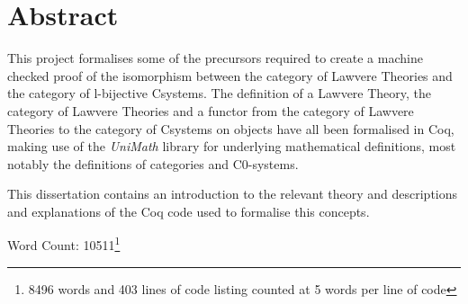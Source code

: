 \chapter*{\centering Abstract}
This project formalises some of the precursors required to create a machine
checked proof of the isomorphism between the category of Lawvere Theories and
the category of l-bijective Csystems. The definition of a Lawvere Theory, the
category of Lawvere Theories and a functor from the category of Lawvere Theories
to the category of Csystems on objects have all been formalised in Coq, making
use of the \textit{UniMath} library for underlying mathematical definitions,
most notably the definitions of categories and C0-systems.

This dissertation contains an introduction to the relevant theory and
descriptions and explanations of the Coq code used to formalise this concepts.

\clearpage
\noindent Word Count: 10511\footnote{8496 words and 403 lines of code listing
counted at 5 words per line of code}